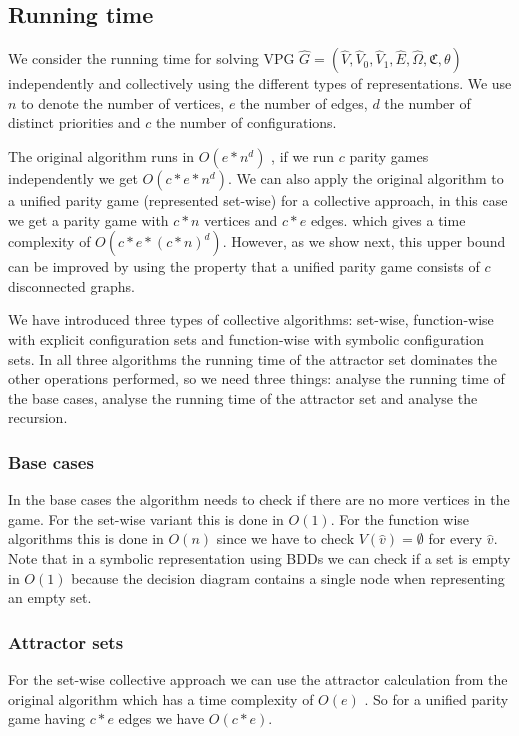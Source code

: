 \subsection{Running time}
We consider the running time for solving VPG $\hat{G} = (\hat{V},\hat{V}_0,\hat{V}_1,\hat{E},\hat{\Omega},\mathfrak{C},\theta)$ independently and collectively using the different types of representations. We use $n$ to denote the number of vertices, $e$ the number of edges, $d$ the number of distinct priorities and $c$ the number of configurations.

The original algorithm runs in $O(e * n^d)$ \cite{friedmanPG}, if we run $c$ parity games independently we get $O(c * e * n ^d)$. We can also apply the original algorithm to a unified parity game (represented set-wise) for a collective approach, in this case we get a parity game with $c*n$ vertices and $c*e$ edges. which gives a time complexity of $O(c*e*(c*n)^d)$. However, as we show next, this upper bound can be improved by using the property that a unified parity game consists of $c$ disconnected graphs.

We have introduced three types of collective algorithms: set-wise, function-wise with explicit configuration sets and function-wise with symbolic configuration sets. In all three algorithms the running time of the attractor set dominates the other operations performed, so we need three things: analyse the running time of the base cases, analyse the running time of the attractor set and analyse the recursion.

\subsubsection{Base cases} In the base cases the algorithm needs to check if there are no more vertices in the game. For the set-wise variant this is done in $O(1)$. For the function wise algorithms this is done in $O(n)$ since we have to check $V(\hat{v}) = \emptyset$ for every $\hat{v}$. Note that in a symbolic representation using BDDs we can check if a set is empty in $O(1)$ because the decision diagram contains a single node when representing an empty set.

\subsubsection{Attractor sets} For the set-wise collective approach we can use the attractor calculation from the original algorithm which has a time complexity of $O(e)$ \cite{Kant2013PracticalIT}. So for a unified parity game having $c*e$ edges we have $O(c*e)$.

